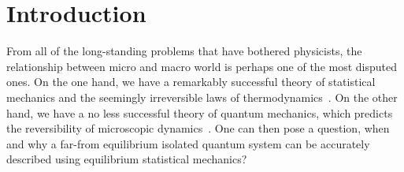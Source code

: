 \chapter{Introduction}
\thispagestyle{chapterBeginStyle}


From all of the long-standing problems that have bothered physicists, the relationship
between micro and macro world is perhaps one of the most disputed ones. On the one
hand, we have a remarkably successful theory of statistical mechanics and the seemingly
irreversible laws of thermodynamics~\autocite{huang1987statistical,Feynman1972}.
On the other hand, we have a no less successful theory of quantum mechanics,
which predicts the reversibility of microscopic dynamics~\autocite{landau1991quantum,Sakurai2017}.
One can then pose a question, when and why a far-from equilibrium isolated quantum system
can be accurately described using equilibrium statistical mechanics?

